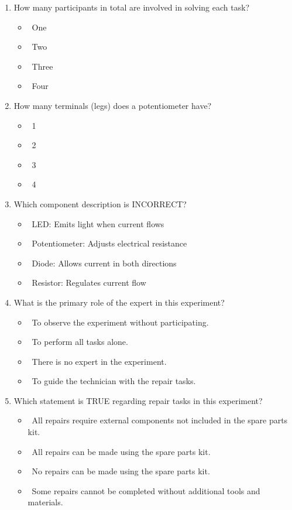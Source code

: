 \documentclass[msom,nonblindrev]{01 latex/class/informs3}
\begin{document}
\begin{APPENDICES}
\begin{enumerate}
  \item How many participants in total are involved in solving each task? 
   \begin{itemize}
    \item \radiobutton\ One
    \item \radiobutton\ Two
    \item \radiobutton\ Three
    \item \radiobutton\ Four
   \end{itemize}
   
  \item How many terminals (legs) does a potentiometer have? 
   \begin{itemize}
    \item \radiobutton\ 1
    \item \radiobutton\ 2
    \item \radiobutton\ 3
    \item \radiobutton\ 4
   \end{itemize}
   
  \item Which component description is INCORRECT?
   \begin{itemize}
    \item \radiobutton\ LED: Emits light when current flows
    \item \radiobutton\ Potentiometer: Adjusts electrical resistance
    \item \radiobutton\ Diode: Allows current in both directions
    \item \radiobutton\ Resistor: Regulates current flow
   \end{itemize}
     
  \item What is the primary role of the expert in this experiment? 
   \begin{itemize}
    \item \radiobutton\ To observe the experiment without participating.
    \item \radiobutton\ To perform all tasks alone.
    \item \radiobutton\ There is no expert in the experiment.
    \item \radiobutton\ To guide the technician with the repair tasks.
   \end{itemize}
   
  \item Which statement is TRUE regarding repair tasks in this experiment?
   \begin{itemize}
    \item \radiobutton\ All repairs require external components not included in the spare parts kit.
    \item \radiobutton\ All repairs can be made using the spare parts kit.
    \item \radiobutton\ No repairs can be made using the spare parts kit.
    \item \radiobutton\ Some repairs cannot be completed without additional tools and materials.
   \end{itemize}
\end{enumerate}



\end{APPENDICES}
\end{document}
